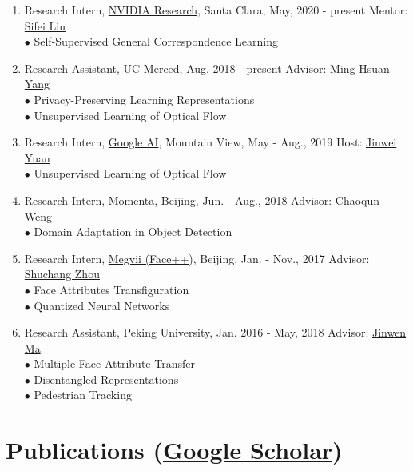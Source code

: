 \documentclass[letterpaper]{article}
\begin{document}
\begin{enumerate}

\item Research Intern, \href{https://www.nvidia.com/en-us/research/}{NVIDIA Research}, Santa Clara, May, 2020 - present \hfill Mentor: \href{https://www.sifeiliu.net/}{Sifei Liu}\\
	$\bullet$ Self-Supervised General Correspondence Learning

\item Research Assistant, UC Merced, Aug. 2018 - present \hfill Advisor: \href{http://faculty.ucmerced.edu/mhyang/}{Ming-Hsuan Yang}\\
	$\bullet$ Privacy-Preserving Learning Representations\\
	$\bullet$ Unsupervised Learning of Optical Flow	

\item Research Intern, \href{https://ai.google/}{Google AI}, Mountain View, May - Aug., 2019 \hfill Host: \href{mailto:jinwei@google.com}{Jinwei Yuan}\\
	$\bullet$ Unsupervised Learning of Optical Flow

\item Research Intern, \href{https://www.momenta.ai/en/}{Momenta}, Beijing, Jun. - Aug., 2018 \hfill Advisor: Chaoqun Weng\\
	$\bullet$ Domain Adaptation in Object Detection

\item Research Intern, \href{https://www.faceplusplus.com}{Megvii (Face++)}, Beijing, Jan. - Nov., 2017 \hfill Advisor: \href{https://zsc.github.io/}{Shuchang Zhou}\\
	$\bullet$ Face Attributes Transfiguration\\
	$\bullet$ Quantized Neural Networks

\item Research Assistant, Peking University, Jan. 2016 - May, 2018 \hfill Advisor: \href{http://www.math.pku.edu.cn/is/~jwma/}{Jinwen Ma}\\
	$\bullet$ Multiple Face Attribute Transfer\\
	$\bullet$ Disentangled Representations\\
	$\bullet$ Pedestrian Tracking
	
\end{enumerate}



\section*{Publications (\href{https://scholar.google.com/citations?user=Op_tr2IAAAAJ}{Google Scholar})}
\end{document}
